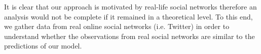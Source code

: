 \documentclass[A4paper,11pt]{article}
\begin{document}
\par It is clear that our approach is motivated by real-life social networks therefore an analysis would not be complete
if it remained in a theoretical level. To this end, we gather data from real online social networks (i.e. Twitter) in
order to understand whether the observations from real social networks are similar to the predictions of our model.

\label{Bibliography}




\end{document}

